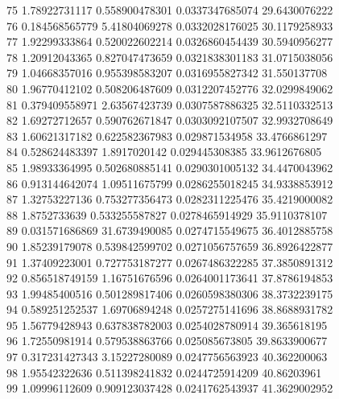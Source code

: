 {75 1.78922731117 0.558900478301 0.0337347685074 29.6430076222 \\
76 0.184568565779 5.41804069278 0.0332028176025 30.1179258933 \\
77 1.92299333864 0.520022602214 0.0326860454439 30.5940956277 \\
78 1.20912043365 0.827047473659 0.0321838301183 31.0715038056 \\
79 1.04668357016 0.955398583207 0.0316955827342 31.550137708 \\
80 1.96770412102 0.508206487609 0.0312207452776 32.0299849062 \\
81 0.379409558971 2.63567423739 0.0307587886325 32.5110332513 \\
82 1.69272712657 0.590762671847 0.0303092107507 32.9932708649 \\
83 1.60621317182 0.622582367983 0.029871534958 33.4766861297 \\
84 0.528624483397 1.8917020142 0.029445308385 33.9612676805 \\
85 1.98933364995 0.502680885141 0.0290301005132 34.4470043962 \\
86 0.913144642074 1.09511675799 0.0286255018245 34.9338853912 \\
87 1.32753227136 0.753277356473 0.0282311225476 35.4219000082 \\
88 1.8752733639 0.533255587827 0.0278465914929 35.9110378107 \\
89 0.031571686869 31.6739490085 0.0274715549675 36.4012885758 \\
90 1.85239179078 0.539842599702 0.0271056757659 36.8926422877 \\
91 1.37409223001 0.727753187277 0.0267486322285 37.3850891312 \\
92 0.856518749159 1.16751676596 0.0264001173641 37.8786194853 \\
93 1.99485400516 0.501289817406 0.0260598380306 38.3732239175 \\
94 0.589251252537 1.69706894248 0.0257275141696 38.8688931782 \\
95 1.56779428943 0.637838782003 0.0254028780914 39.365618195 \\
96 1.72550981914 0.579538863766 0.025085673805 39.8633900677 \\
97 0.317231427343 3.15227280089 0.0247756563923 40.362200063 \\
98 1.95542322636 0.511398241832 0.0244725914209 40.86203961 \\
99 1.09996112609 0.909123037428 0.0241762543937 41.3629002952 \\
}
